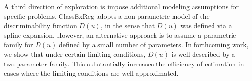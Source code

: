 \documentclass[twoside,11pt]{article}
\begin{document}

A third direction of exploration is impose additional modeling assumptions for specific problems.  ClassExReg adopts a non-parametric model of the discriminability function $D(u)$, in the sense that $D(u)$ was defined via a spline expansion.   However, an alternative approach is to assume a parametric family for $D(u)$ defined by a small number of parameters.  In forthcoming work, we show that under certain limiting conditions, $D(u)$ is well-described by a two-parameter family.  This substantially increases the efficiency of estimation in cases where the limiting conditions are well-approximated.






\end{document}
